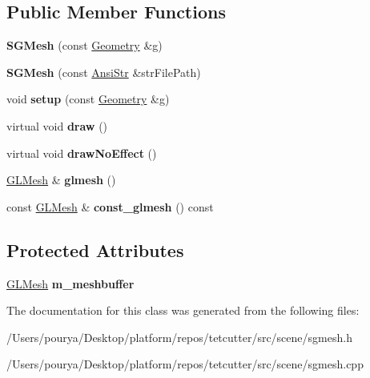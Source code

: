 \subsection*{Public Member Functions}
\begin{DoxyCompactItemize}
\item 
\hypertarget{classps_1_1scene_1_1SGMesh_ab9f55878b86063412f7998000d118430}{}{\bfseries S\+G\+Mesh} (const \hyperlink{classps_1_1scene_1_1Geometry}{Geometry} \&g)\label{classps_1_1scene_1_1SGMesh_ab9f55878b86063412f7998000d118430}

\item 
\hypertarget{classps_1_1scene_1_1SGMesh_aaa3f47f4132a037d6149aaaec70403ad}{}{\bfseries S\+G\+Mesh} (const \hyperlink{classps_1_1base_1_1CAString}{Ansi\+Str} \&str\+File\+Path)\label{classps_1_1scene_1_1SGMesh_aaa3f47f4132a037d6149aaaec70403ad}

\item 
\hypertarget{classps_1_1scene_1_1SGMesh_a989c881261d9eb732ed550e86b9e434f}{}void {\bfseries setup} (const \hyperlink{classps_1_1scene_1_1Geometry}{Geometry} \&g)\label{classps_1_1scene_1_1SGMesh_a989c881261d9eb732ed550e86b9e434f}

\item 
\hypertarget{classps_1_1scene_1_1SGMesh_ac17391a0c735b5978269cf461aa2bfee}{}virtual void {\bfseries draw} ()\label{classps_1_1scene_1_1SGMesh_ac17391a0c735b5978269cf461aa2bfee}

\item 
\hypertarget{classps_1_1scene_1_1SGMesh_a11b6a3946977d278ae2ddf722f7ce5d5}{}virtual void {\bfseries draw\+No\+Effect} ()\label{classps_1_1scene_1_1SGMesh_a11b6a3946977d278ae2ddf722f7ce5d5}

\item 
\hypertarget{classps_1_1scene_1_1SGMesh_af847f0e5e010d8df3656a40e733388ac}{}\hyperlink{classps_1_1opengl_1_1GLMesh}{G\+L\+Mesh} \& {\bfseries glmesh} ()\label{classps_1_1scene_1_1SGMesh_af847f0e5e010d8df3656a40e733388ac}

\item 
\hypertarget{classps_1_1scene_1_1SGMesh_a30627b03bd6e3052d4dfb33d6c8f33df}{}const \hyperlink{classps_1_1opengl_1_1GLMesh}{G\+L\+Mesh} \& {\bfseries const\+\_\+glmesh} () const \label{classps_1_1scene_1_1SGMesh_a30627b03bd6e3052d4dfb33d6c8f33df}

\end{DoxyCompactItemize}
\subsection*{Protected Attributes}
\begin{DoxyCompactItemize}
\item 
\hypertarget{classps_1_1scene_1_1SGMesh_ad1d4d7b11d99bcc4d6dee106191fb0cf}{}\hyperlink{classps_1_1opengl_1_1GLMesh}{G\+L\+Mesh} {\bfseries m\+\_\+meshbuffer}\label{classps_1_1scene_1_1SGMesh_ad1d4d7b11d99bcc4d6dee106191fb0cf}

\end{DoxyCompactItemize}


The documentation for this class was generated from the following files\+:\begin{DoxyCompactItemize}
\item 
/\+Users/pourya/\+Desktop/platform/repos/tetcutter/src/scene/sgmesh.\+h\item 
/\+Users/pourya/\+Desktop/platform/repos/tetcutter/src/scene/sgmesh.\+cpp\end{DoxyCompactItemize}
